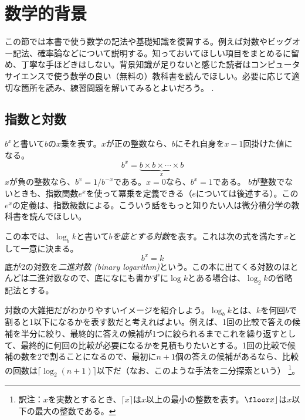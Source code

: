 \section{数学的背景}
この節では本書で使う数学の記法や基礎知識を復習する。例えば対数やビッグオー記法、確率論などについて説明する。知っておいてほしい項目をまとめるに留め、丁寧な手ほどきはしない。背景知識が足りないと感じた読者はコンピュータサイエンスで使う数学の良い（無料の）教科書を読んでほしい。必要に応じて適切な箇所を読み、練習問題を解いてみるとよいだろう。
\cite{llm11}.

\subsection{指数と対数}

$b^x$と書いて$b$の$x$乗を表す。$x$が正の整数なら、$b$にそれ自身を$x-1$回掛けた値になる。
\[
    b^x = \underbrace{b\times b\times \cdots \times b}_{x}
\]
$x$が負の整数なら、$b^x=1/b^{-x}$である。$x=0$なら、$b^x=1$である。
$b$が整数でないときも、指数関数$e^x$を使って冪乗を定義できる（$e$については後述する）。この$e^x$の定義は、指数級数による。こういう話をもっと知りたい人は微分積分学の教科書を読んでほしい。

この本では、$\log_b k$と書いて\emph{$b$を底とする対数}を表す。これは次の式を満たす$x$として一意に決まる。
\[
    b^{x} = k
\]
底が2の対数を\emph{二進対数 (binary logarithm)}という。この本に出てくる対数のほとんどは二進対数なので、底になにも書かずに$\log k$とある場合は、$\log_2 k$の省略記法とする。
%
%

対数の大雑把だがわかりやすいイメージを紹介しよう。$\log_b k$とは、$k$を何回$b$で割ると1以下になるかを表す数だと考えればよい。例えば、1回の比較で答えの候補を半分に絞り、最終的に答えの候補が1つに絞られるまでこれを繰り返すとして、最終的に何回の比較が必要になるかを見積もりたいとする。1回の比較で候補の数を$2$で割ることになるので、最初に$n+1$個の答えの候補があるなら、比較の回数は$\lceil \log_2(n+1) \rceil$以下だ（なお、このような手法を二分探索という）%
\footnote{訳注：$x$を実数とするとき、$\lceil x \rceil$は$x$以上の最小の整数を表す。$\floor x \rfloor$は$x$以下の最大の整数である。}。

